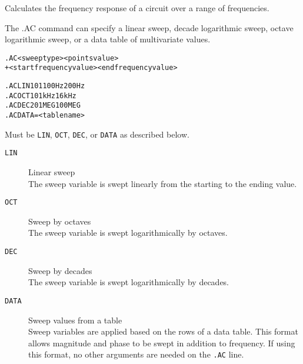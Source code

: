 


Calculates the frequency response of a circuit over a range of frequencies.

The .AC command can specify a linear sweep, decade logarithmic sweep,
octave logarithmic sweep, or a data table of multivariate values.

\begin{Command}

\format
\begin{alltt}
.AC <sweep type> <points value>
+ <start frequency value> <end frequency value>
\end{alltt}

\examples
\begin{alltt}
.AC LIN 101 100Hz 200Hz
.AC OCT 10 1kHz 16kHz
.AC DEC 20 1MEG 100MEG
.AC DATA=<table name>
\end{alltt}

\arguments

\begin{Arguments}

Must be \texttt{LIN}, \texttt{OCT}, \texttt{DEC}, or \texttt{DATA} as described below.
\begin{description}

\item[\tt LIN] Linear sweep\\
The sweep variable is swept linearly from the starting to the ending value.

\item[\tt OCT] Sweep by octaves\\
The sweep variable is swept logarithmically by octaves.

\item[\tt DEC] Sweep by decades\\
The sweep variable is swept logarithmically by decades.

\item[\tt DATA] Sweep values from a table\\
Sweep variables are applied based on the rows of a data table.  This format allows magnitude and phase to be swept in addition to frequency.    If using this format, no other arguments are needed on the \texttt{.AC} line.


\end{description}
\end{Arguments}
\end{Command}
